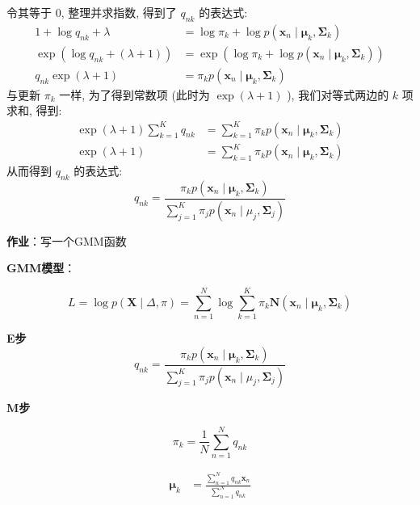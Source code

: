 \documentclass[UTF8]{ctexart}
\begin{document}
令其等于 0, 整理并求指数, 得到了 $q_{n k}$ 的表达式:
$$
\begin{aligned}
1+\log q_{n k}+\lambda &=\log \pi_{k}+\log p\left(\boldsymbol{x}_{n} \mid \boldsymbol{\mu}_{k}, \boldsymbol{\Sigma}_{k}\right) \\
\exp \left(\log q_{nk}+(\lambda+1)\right) &=\exp \left(\log \pi_{k}+\log p\left(\boldsymbol{x}_{n} \mid \boldsymbol{\mu}_{k}, \boldsymbol{\Sigma}_{k}\right)\right) \\
q_{nk} \exp (\lambda+1) &=\pi_{k} p\left(\boldsymbol{x}_{n} \mid \boldsymbol{\mu}_{k}, \boldsymbol{\Sigma}_{k}\right)
\end{aligned}
$$
与更新 $\pi_{k}$ 一样, 为了得到常数项 (此时为 $\exp (\lambda+1)$ ), 我们对等式两边的 $k$ 项求和, 得到:
$$
\begin{aligned}
\exp (\lambda+1) \sum_{k=1}^{K} q_{n k} &=\sum_{k=1}^{K} \pi_{k} p\left(\boldsymbol{x}_{n} \mid \boldsymbol{\mu}_{k}, \boldsymbol{\Sigma}_{k}\right) \\
\exp (\lambda+1) &=\sum_{k=1}^{K} \pi_{k} p\left(\boldsymbol{x}_{n} \mid \boldsymbol{\mu}_{k}, \boldsymbol{\Sigma}_{k}\right)
\end{aligned}
$$
从而得到 $q_{nk}$ 的表达式:
$$
q_{n k}=\frac{\pi_{k} p\left(\boldsymbol{x}_{n} \mid \boldsymbol{\mu}_{k}, \boldsymbol{\Sigma}_{k}\right)}{\sum_{j=1}^{K} \pi_{j} p\left(\boldsymbol{x}_{n} \mid \mu_{j}, \boldsymbol{\Sigma}_{j}\right)}
$$

\newpage
\textbf{作业}：写一个GMM函数

\textbf{GMM模型}：

\begin{equation}
L=\log p(\boldsymbol{X} \mid \Delta, \pi)=\sum_{n=1}^{N} \log \sum_{k=1}^{K} \pi_{k} \boldsymbol{N}\left(\boldsymbol{x}_{n} \mid \boldsymbol{\mu}_{k}, \boldsymbol{\Sigma}_{k}\right) 
\end{equation}

\textbf{E步}
$$
q_{n k}=\frac{\pi_{k} p\left(\boldsymbol{x}_{n} \mid \boldsymbol{\mu}_{k}, \boldsymbol{\Sigma}_{k}\right)}{\sum_{j=1}^{K} \pi_{j} p\left(\boldsymbol{x}_{n} \mid \mu_{j}, \boldsymbol{\Sigma}_{j}\right)}
$$

\textbf{M步}

\begin{equation}
    \pi_{k}=\frac{1}{N} \sum_{n=1}^{N} q_{n k}
\end{equation}

$$
\begin{aligned}
\boldsymbol{\mu}_{k} &=\frac{\sum_{n=1}^{N} q_{n k} \boldsymbol{x}_{n}}{\sum_{n=1}^{N} q_{n k}}
\end{aligned}
$$
\end{document}
